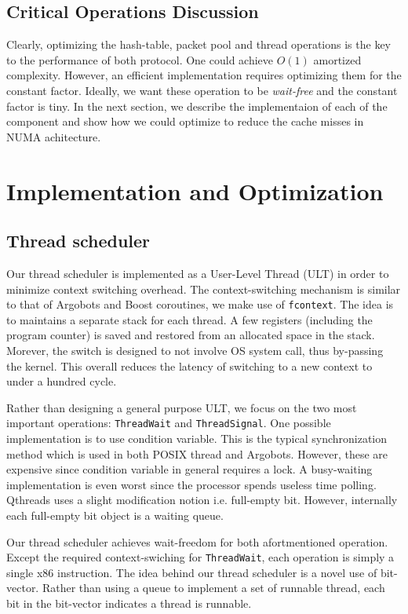 \documentclass[11pt]{article}
\begin{document}
\subsection{Critical Operations Discussion}
Clearly, optimizing the hash-table, packet pool and thread operations is the
key to the performance of both protocol. One could achieve $O(1)$ amortized
complexity.  However, an efficient implementation requires optimizing them for
the constant factor. Ideally, we want these operation to be \textit{wait-free}
and the constant factor is tiny. In the next section, we describe the
implementaion of each of the component and show how we could optimize to reduce
the cache misses in NUMA achitecture.

\section{Implementation and Optimization}
\subsection{Thread scheduler}
Our thread scheduler is implemented as a User-Level Thread (ULT) in order to
minimize context switching overhead. The context-switching mechanism is similar
to that of Argobots and Boost coroutines, we make use of \texttt{fcontext}. The
idea is to maintains a separate stack for each thread. A few registers
(including the program counter) is saved and restored from an allocated space
in the stack. Morever, the switch is designed to not involve OS system call,
thus by-passing the kernel. This overall reduces the latency of switching to a
new context to under a hundred cycle.

Rather than designing a general purpose ULT, we focus on the two most important
operations: \texttt{ThreadWait} and \texttt{ThreadSignal}.  One possible
implementation is to use condition variable. This is the typical
synchronization method which is used in both POSIX thread and Argobots.
However, these are expensive since condition variable in general requires a
lock. A busy-waiting implementation is even worst since the processor spends
useless time polling. Qthreads uses a slight modification notion i.e.
full-empty bit. However, internally each full-empty bit object is a waiting
queue.

Our thread scheduler achieves wait-freedom for both afortmentioned operation.
Except the required context-swiching for \texttt{ThreadWait}, each operation is
simply a single x86 instruction. The idea behind our thread scheduler is a novel
use of bit-vector. Rather than using a queue to implement a set of runnable thread,
each bit in the bit-vector indicates a thread is runnable.
\end{document}
